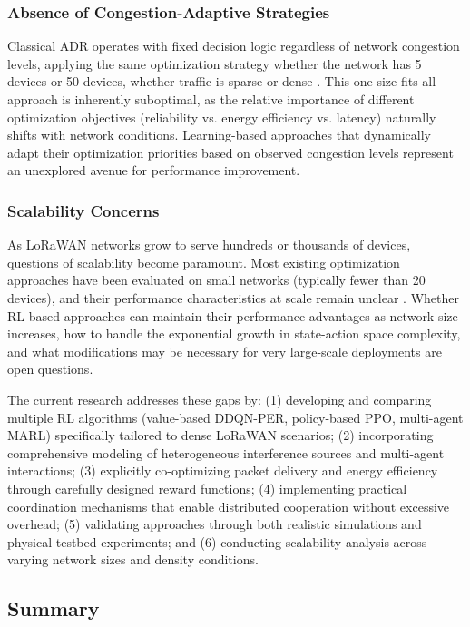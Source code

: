 \documentclass[12pt,a4paper]{article}
\begin{document}
\subsubsection{Absence of Congestion-Adaptive Strategies}

Classical ADR operates with fixed decision logic regardless of network congestion levels, applying the same optimization strategy whether the network has 5 devices or 50 devices, whether traffic is sparse or dense \cite{cuomo2017explora}. This one-size-fits-all approach is inherently suboptimal, as the relative importance of different optimization objectives (reliability vs. energy efficiency vs. latency) naturally shifts with network conditions. Learning-based approaches that dynamically adapt their optimization priorities based on observed congestion levels represent an unexplored avenue for performance improvement.

\subsubsection{Scalability Concerns}

As LoRaWAN networks grow to serve hundreds or thousands of devices, questions of scalability become paramount. Most existing optimization approaches have been evaluated on small networks (typically fewer than 20 devices), and their performance characteristics at scale remain unclear \cite{reynders2018improving}. Whether RL-based approaches can maintain their performance advantages as network size increases, how to handle the exponential growth in state-action space complexity, and what modifications may be necessary for very large-scale deployments are open questions.

The current research addresses these gaps by: (1) developing and comparing multiple RL algorithms (value-based DDQN-PER, policy-based PPO, multi-agent MARL) specifically tailored to dense LoRaWAN scenarios; (2) incorporating comprehensive modeling of heterogeneous interference sources and multi-agent interactions; (3) explicitly co-optimizing packet delivery and energy efficiency through carefully designed reward functions; (4) implementing practical coordination mechanisms that enable distributed cooperation without excessive overhead; (5) validating approaches through both realistic simulations and physical testbed experiments; and (6) conducting scalability analysis across varying network sizes and density conditions.

\subsection{Summary}
\label{subsec:summary}
\end{document}
